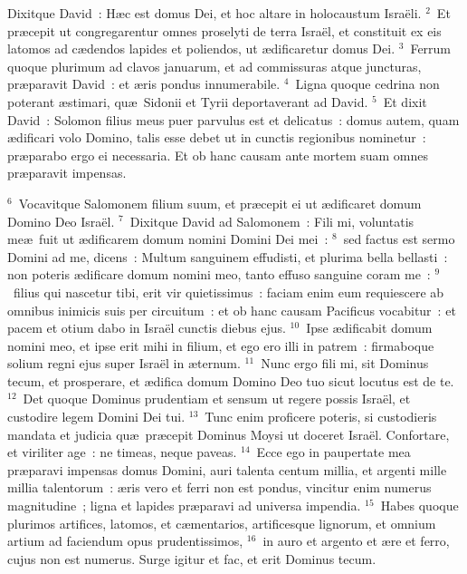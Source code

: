 \lettrine[lines=3,image=true,loversize=0.05,lraise=-0.03]{D}{}ixitque David~: H\ae c est domus Dei, et hoc altare in holocaustum Isra\"eli.
${}^{2}$~Et pr\ae cepit ut congregarentur omnes proselyti de terra Isra\"el, et constituit ex eis latomos ad c\ae dendos lapides et poliendos, ut \ae dificaretur domus Dei.
${}^{3}$~Ferrum quoque plurimum ad clavos januarum, et ad commissuras atque juncturas, pr\ae paravit David~: et \ae ris pondus innumerabile.
${}^{4}$~Ligna quoque cedrina non poterant \ae stimari, qu\ae\ Sidonii et Tyrii deportaverant ad David.
${}^{5}$~Et dixit David~: Solomon filius meus puer parvulus est et delicatus~: domus autem, quam \ae dificari volo Domino, talis esse debet ut in cunctis regionibus nominetur~: pr\ae parabo ergo ei necessaria. Et ob hanc causam ante mortem suam omnes pr\ae paravit impensas.


${}^{6}$~Vocavitque Salomonem filium suum, et pr\ae cepit ei ut \ae dificaret domum Domino Deo Isra\"el.
${}^{7}$~Dixitque David ad Salomonem~: Fili mi, voluntatis me\ae\ fuit ut \ae dificarem domum nomini Domini Dei mei~:
${}^{8}$~sed factus est sermo Domini ad me, dicens~: Multum sanguinem effudisti, et plurima bella bellasti~: non poteris \ae dificare domum nomini meo, tanto effuso sanguine coram me~:
${}^{9}$~filius qui nascetur tibi, erit vir quietissimus~: faciam enim eum requiescere ab omnibus inimicis suis per circuitum~: et ob hanc causam Pacificus vocabitur~: et pacem et otium dabo in Isra\"el cunctis diebus ejus.
${}^{10}$~Ipse \ae dificabit domum nomini meo, et ipse erit mihi in filium, et ego ero illi in patrem~: firmaboque solium regni ejus super Isra\"el in \ae ternum.
${}^{11}$~Nunc ergo fili mi, sit Dominus tecum, et prosperare, et \ae difica domum Domino Deo tuo sicut locutus est de te.
${}^{12}$~Det quoque Dominus prudentiam et sensum ut regere possis Isra\"el, et custodire legem Domini Dei tui.
${}^{13}$~Tunc enim proficere poteris, si custodieris mandata et judicia qu\ae\ pr\ae cepit Dominus Moysi ut doceret Isra\"el. Confortare, et viriliter age~: ne timeas, neque paveas.
${}^{14}$~Ecce ego in paupertate mea pr\ae paravi impensas domus Domini, auri talenta centum millia, et argenti mille millia talentorum~: \ae ris vero et ferri non est pondus, vincitur enim numerus magnitudine~; ligna et lapides pr\ae paravi ad universa impendia.
${}^{15}$~Habes quoque plurimos artifices, latomos, et c\ae mentarios, artificesque lignorum, et omnium artium ad faciendum opus prudentissimos,
${}^{16}$~in auro et argento et \ae re et ferro, cujus non est numerus. Surge igitur et fac, et erit Dominus tecum.


